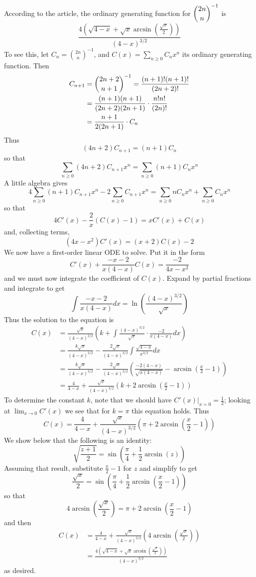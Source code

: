 \documentclass[12pt]{article}
\begin{document}
According to the  article, the ordinary generating function for $\dbinom{2n}{n}^{-1}$ is
\[
  \frac{4\left(\sqrt{4-x}+\sqrt{x}\arcsin\left(\frac{\sqrt{x}}{2}\right)\right)}{(4-x)^{3/2}}
\]
To see this, let $C_n = \binom{2n}{n}^{-1}$, and $C(x) = \sum_{n\geq 0}C_nx^n$ its ordinary generating function. Then
\begin{align*}
  C_{n+1} &= \dbinom{2n+2}{n+1}^{-1} = \frac{(n+1)!(n+1)!}{(2n+2)!} \\
          & = \frac{(n+1)(n+1)}{(2n+2)(2n+1)}\cdot \frac{n!n!}{(2n)!} \\
          &= \frac{n+1}{2(2n+1)}\cdot C_n
\end{align*}
Thus
\[
  (4n+2)C_{n+1} = (n+1)C_n
\]
so that
\[
  \sum_{n\geq 0} (4n+2)C_{n+1}x^n = \sum_{n\geq 0} (n+1)C_nx^n
\]
A little algebra gives
\[
  4\sum_{n\geq 0} (n+1)C_{n+1}x^n - 2\sum_{n\geq 0}C_{n+1}x^n = \sum_{n\geq 0}nC_nx^n + \sum_{n\geq 0}C_nx^n
\]
so that
\[
  4C'(x) - \frac{2}{x}(C(x)-1) = xC'(x) + C(x)
\]
and, collecting terms,
\[
  (4x-x^2)C'(x) = (x+2)C(x)-2
\]
We now have a first-order linear ODE to solve. Put it in the form
\[
  C'(x) + \frac{-x-2}{x(4-x)}C(x) = \frac{-2}{4x-x^2}
\]
and we must now integrate the coefficient of $C(x)$. Expand by partial fractions and integrate to get
\[
  \int \frac{-x-2}{x(4-x)} dx = \ln\left(\frac{(4-x)^{3/2}}{\sqrt{x}}\right)
\]
Thus the solution to the equation is
\begin{align*}
  C(x) &= \frac{\sqrt{x}}{(4-x)^{3/2}}\left(k + \int \frac{(4-x)^{3/2}}{\sqrt{x}}\cdot 
                       \frac{-2}{x(4-x)}dx\right) \\
       &= \frac{k\sqrt{x}}{(4-x)^{3/2}} - \frac{2\sqrt{x}}{(4-x)^{3/2}}\int\frac{\sqrt{4-x}}{x^{3/2}}dx \\
       &= \frac{k\sqrt{x}}{(4-x)^{3/2}} - \frac{2\sqrt{x}}{(4-x)^{3/2}}\left(\frac{-2(4-x)}{\sqrt{x(4-x)}}
                       - \arcsin\left(\frac{x}{2}-1\right)\right)\\
       &= \frac{4}{4-x} + \frac{\sqrt{x}}{(4-x)^{3/2}}\left(k+2\arcsin\left(\frac{x}{2}-1\right)\right) 
\end{align*}
To determine the constant $k$, note that we should have $C'(x)\big\lvert_{x=0}=\frac{1}{2}$; looking at $\lim_{x\to 0}C'(x)$ we see that for $k=\pi$ this equation holds. Thus
\[
  C(x) = \frac{4}{4-x} + \frac{\sqrt{x}}{(4-x)^{3/2}}\left(\pi+2\arcsin\left(\frac{x}{2}-1\right)\right)
\]
We show below that the following is an identity:
\[
  \sqrt{\frac{z+1}{2}} = \sin\left(\frac{\pi}{4} + \frac{1}{2}\arcsin(z)\right)
\]
Assuming that result, substitute $\frac{x}{2}-1$ for $z$ and simplify to get
\[
  \frac{\sqrt{x}}{2} = \sin\left(\frac{\pi}{4} + \frac{1}{2}\arcsin\left(\frac{x}{2}-1\right)\right)
\]
so that
\[
  4\arcsin\left(\frac{\sqrt{x}}{2}\right) = \pi + 2\arcsin\left(\frac{x}{2}-1\right)
\]
and then
\begin{align*}
  C(x) &= \frac{4}{4-x}+\frac{\sqrt{x}}{(4-x)^{3/2}}\left(4\arcsin\left(\frac{\sqrt{x}}{2}\right)\right) \\
       &= \frac{4\left(\sqrt{4-x} + \sqrt{x}\arcsin\left(\frac{\sqrt{x}}{2}\right)\right)}{(4-x)^{3/2}}
\end{align*}
as desired.
\end{document}
